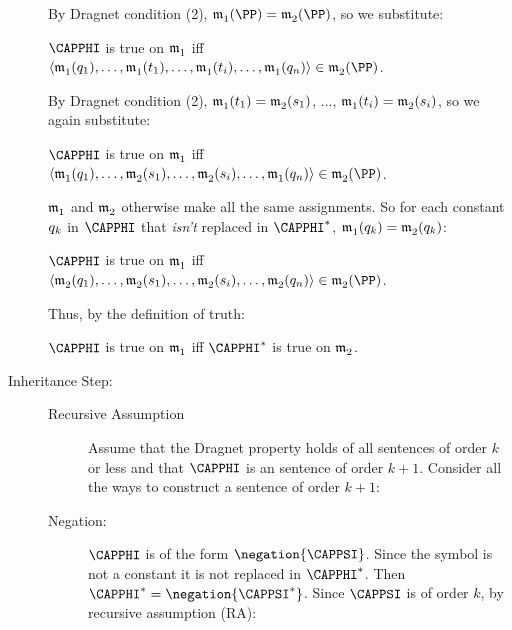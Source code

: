 \begin{PROOF}
\begin{description}
\begin{cenumerate}
By Dragnet condition (2), $\As{}{1}(\PP)=\As{}{2}(\PP)$, so we substitute:
\begin{center}
	$\CAPPHI$ is true on $\mathfrak{m^{\mathrm{}}_{\mathrm{1}}}$ iff $\langle\As{}{1}(\variable{q}_{\integer{1}}),\ldots,\As{}{1}(\variable{t}_1),\ldots,\As{}{1}(\variable{t}_{\integer{i}}),\ldots,\As{}{1}(\variable{q}_{\integer{n}})\rangle\in\As{}{2}(\PP)$.
\end{center}

By Dragnet condition (2), $\mathfrak{m^{\mathrm{}}_{\mathrm{1}}}(t_1)=\mathfrak{m^{\mathrm{}}_{\mathrm{2}}}(s_1)$, $\ldots$, $\mathfrak{m^{\mathrm{}}_{\mathrm{1}}}(t_{i})=\mathfrak{m^{\mathrm{}}_{\mathrm{2}}}(s_{i})$, so we again substitute:
\begin{center}
$\CAPPHI$ is true on $\mathfrak{m^{\mathrm{}}_{\mathrm{1}}}$ iff $\langle\As{}{1}(\variable{q}_{\integer{1}}),\ldots,\As{}{2}(\variable{s}_1),\ldots,\As{}{2}(\variable{s}_{\integer{i}}),\ldots,\As{}{1}(\variable{q}_{\integer{n}})\rangle\in\As{}{2}(\PP)$.
\end{center}

$\mathfrak{m^{\mathrm{}}_{\mathrm{1}}}$ and $\mathfrak{m^{\mathrm{}}_{\mathrm{2}}}$ otherwise make all the same assignments.
So for each constant $q_k$ in $\CAPPHI$ that \emph{isn't} replaced in $\CAPPHI^*$, $\mathfrak{m^{\mathrm{}}_{\mathrm{1}}}(q_{k})=\mathfrak{m^{\mathrm{}}_{\mathrm{2}}}(q_{k})$: 
\begin{center}
$\CAPPHI$ is true on $\mathfrak{m^{\mathrm{}}_{\mathrm{1}}}$ iff $\langle\As{}{2}(\variable{q}_{\integer{1}}),\ldots,\As{}{2}(\variable{s}_1),\ldots,\As{}{2}(\variable{s}_{\integer{i}}),\ldots,\As{}{2}(\variable{q}_{\integer{n}})\rangle\in\As{}{2}(\PP)$.
\end{center}

Thus, by the definition of truth:
\begin{center}
    $\CAPPHI$ is true on $\mathfrak{m^{\mathrm{}}_{\mathrm{1}}}$ iff $\CAPPHI^*$ is true on $\mathfrak{m^{\mathrm{}}_{\mathrm{2}}}$.
\end{center}
\end{cenumerate}
\item[Inheritance Step:] \hfill 
\begin{description}
\item[Recursive Assumption] Assume that the Dragnet property holds of all \GQL{} sentences of order $k$ or less and that $\CAPPHI$ is an \GQL{} sentence of order $k+1$.
Consider all the ways to construct a sentence of order $k+1$:

\item[Negation:] $\CAPPHI$ is of the form $\negation{\CAPPSI}$.
Since the symbol \mention{$\NEGATION$} is not a constant it is not replaced in $\CAPPHI^*$.
Then $\CAPPHI^*=\negation{\CAPPSI^*}$.
Since $\CAPPSI$ is of order $k$, by recursive assumption (RA):


\end{description}
\end{description}
\end{PROOF}

